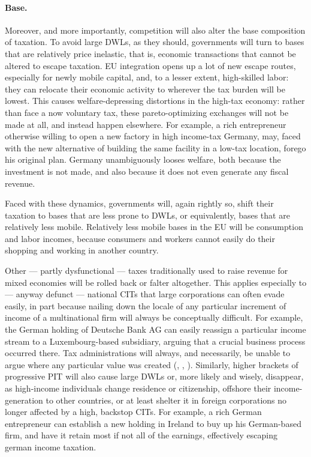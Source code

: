 \documentclass[11pt,a4paper,oneside,openright]{article}
\begin{document}

\paragraph{Base.} Moreover, and more importantly, competition will also alter the base composition of taxation. 
To avoid large \glspl{DWL}, as they should, governments will turn to bases that are relatively price inelastic, that is, economic transactions that cannot be altered to escape taxation. 
\gls{EU} integration opens up a lot of new escape routes, especially for newly mobile capital, and, to a lesser extent, high-skilled labor: 
they can relocate their economic activity to wherever the tax burden will be lowest. 
This causes welfare-depressing distortions in the high-tax economy: 
rather than face a now voluntary tax, these pareto-optimizing exchanges will not be made at all, and instead happen elsewhere. 
For example, a rich entrepreneur otherwise willing to open a new factory in high income-tax Germany, may, faced with the new alternative of building the same facility in a low-tax location, forego his original plan. 
Germany unambiguously looses welfare, both because the investment is not made, and also because it does not even generate any fiscal revenue.

Faced with these dynamics, governments will, again rightly so, shift their taxation to bases that are less prone to \glspl{DWL}, or equivalently, bases that are relatively less mobile. 
Relatively less mobile bases in the \gls{EU} will be consumption and labor incomes, because consumers and workers cannot easily do their shopping and working in another country. 

Other --- partly dysfunctional --- taxes traditionally used to raise revenue for mixed economies will be rolled back or falter altogether. 
This applies especially to --- anyway defunct --- national \glspl{CIT} that large corporations can often evade easily, in part because nailing down the locale of any particular increment of income of a multinational firm will always be conceptually difficult. 
For example, the German holding of Deutsche Bank AG can easily reassign a particular income stream to a Luxembourg-based subsidiary, arguing that a crucial business process occurred there. 
Tax administrations will always, and necessarily, be unable to argue where any particular value was created (\citealt{Ganghof2006}, \citealt{Ganghof}, \citealt[5]{Ganghof2007}). 
Similarly, higher brackets of progressive \gls{PIT} will also cause large \glspl{DWL} or, more likely and wisely, disappear, as high-income individuals change residence or citizenship, offshore their income-generation to other countries, or at least shelter it in foreign corporations no longer affected by a high, backstop \glspl{CIT}. 
For example, a rich German entrepreneur can establish a new holding in Ireland to buy up his German-based firm, and have it retain most if not all of the earnings, effectively escaping german income taxation. 
\end{document}
